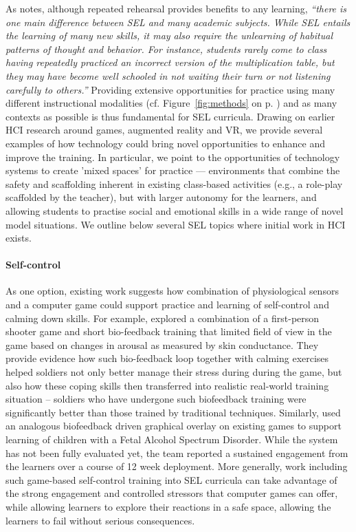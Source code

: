 \documentclass[prodmode,acmtochi]{acmsmall}
\newcommand{\inqq}[1]{\textrm{\textit{``#1''}}}
\begin{document}
 As \cite[p. 55]{Elias1997} notes, although repeated rehearsal  provides benefits to any learning, \inqq{there is one main difference between SEL and many academic subjects. While SEL entails the learning of many new skills, it may also require the unlearning of habitual patterns of thought and behavior. For instance, students rarely come to class having repeatedly practiced an incorrect version of the multiplication table, but they may have become well schooled in not waiting their turn or not listening carefully to others.} Providing extensive opportunities for practice using many different instructional modalities (cf. Figure~\ref{fig:methods} on p. \pageref{fig:methods}) and as many contexts as possible \cite{ref,ref} is thus fundamental for SEL curricula. 
%
Drawing on earlier HCI research around games, augmented reality and VR, we provide several examples of how technology could bring novel opportunities to enhance and improve the training. In particular, we point to the opportunities of technology systems to create 'mixed spaces' for practice --- environments that combine the safety and scaffolding inherent in existing class-based activities (e.g., a role-play scaffolded by the teacher), but with larger autonomy for the learners, and allowing students to practise social and emotional skills in a wide range of novel model situations. We outline below several SEL topics where initial work in HCI exists. 

\paragraph{Self-control} As one option, existing work suggests how combination of physiological sensors and a computer game could support practice and learning of self-control and calming down skills. For example,  explored a combination of a first-person shooter game and short bio-feedback training that limited field of view in the game based on changes in arousal as measured by skin conductance. They provide evidence how such bio-feedback loop together with calming exercises helped soldiers not only better manage their stress during during the game, but also how these coping skills then transferred into realistic real-world training situation -- soldiers who have undergone such biofeedback training were significantly better than those trained by traditional techniques. Similarly,  used an analogous biofeedback driven graphical overlay on existing games to support learning of children with a Fetal Alcohol Spectrum Disorder. While the system has not been fully evaluated yet, the team reported a sustained engagement from the learners over a course of 12 week deployment. More generally, work  including such game-based self-control training into SEL curricula can take advantage of the strong engagement and controlled stressors that computer games can offer, while allowing learners to explore their reactions in a safe space, allowing the learners to fail without serious consequences.  
\end{document}
